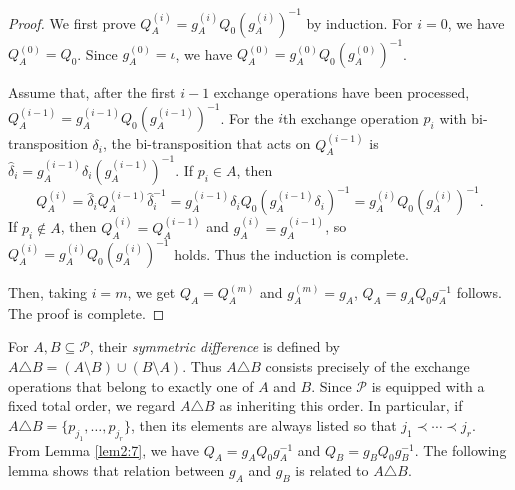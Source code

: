 \documentclass[10pt,a4paper]{amsart}
\begin{document}
\begin{proof} We first prove  $Q_A^{(i)}=g_A^{(i)}Q_0(g_A^{(i)})^{-1}$ by induction. For $i=0$, we have $Q_A^{(0)}=Q_0$. Since $g_A^{(0)}=\iota$, we have $Q_A^{(0)}=g_A^{(0)}Q_0(g_A^{(0)})^{-1}$.

Assume that, after the first $i-1$ exchange operations have been processed, $Q_A^{(i-1)}=g_A^{(i-1)}Q_0(g_A^{(i-1)})^{-1}$.   For the $i$th exchange operation $p_i$ with  bi-transposition $\delta_i$, the bi-transposition that acts on
$Q_A^{(i-1)}$ is $\widehat\delta_i=g_A^{(i-1)}\delta_i(g_A^{(i-1)})^{-1}$. If $p_i\in A$, then $$Q_A^{(i)} =\widehat\delta_iQ_A^{(i-1)}\widehat\delta_i^{-1} =g_A^{(i-1)}\delta_iQ_0 (g_A^{(i-1)}\delta_i)^{-1} =g_A^{(i)}Q_0(g_A^{(i)})^{-1}.$$ If $p_i\notin A$, then $Q_A^{(i)}=Q_A^{(i-1)}$ and $g_A^{(i)}=g_A^{(i-1)}$, so $Q_A^{(i)}=g_A^{(i)}Q_0(g_A^{(i)})^{-1}$ holds. Thus the induction is complete.

Then, taking $i=m$, we get $Q_A=Q_A^{(m)}$ and $g_A^{(m)}=g_A$, $Q_A=g_AQ_0g_A^{-1}$ follows. The proof is complete.
 \end{proof}


For $A,B\subseteq\mathcal P$, their \emph{symmetric difference} is defined by
$A\triangle B=(A\setminus B)\cup(B\setminus A)$. Thus
$A\triangle B$ consists precisely of the exchange operations that belong
to exactly one of $A$ and $B$. Since $\mathcal P$ is equipped with a
fixed total order, we regard $A\triangle B$ as inheriting this order.
In particular, if
$A\triangle B=\{p_{j_1},\ldots,p_{j_r}\}$, then its elements are always
listed so that $j_1\prec\cdots\prec j_r$.
From Lemma \ref{lem2:7}, we have $Q_A=g_AQ_0g_A^{-1}$ and $Q_B=g_BQ_0g_B^{-1}$. The following lemma shows that relation between $g_A$ and $g_B$ is related to $A\triangle B$.
\end{document}
